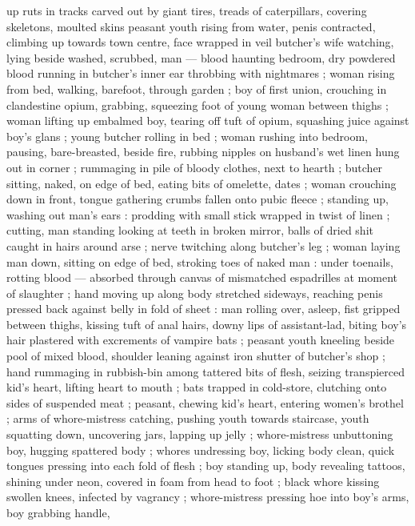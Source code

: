up ruts in tracks carved out by giant tires, treads of caterpillars, covering skeletons, moulted
skins {\semislash} peasant youth rising from water, penis contracted, climbing up towards town
centre, face wrapped in veil {\semislash} butcher's %
wife watching, lying beside washed, scrubbed, man --- blood haunting bedroom, dry powdered blood
running in butcher's inner ear throbbing with nightmares ; woman rising from bed, walking, barefoot,
through garden ; boy of first union, crouching in clandestine opium, grabbing, squeezing foot of
young woman between thighs ; woman lifting up embalmed boy, tearing off tuft of opium, squashing
juice against boy's glans ; young butcher rolling in bed ; woman rushing into bedroom, pausing,
bare-breasted, beside fire, rubbing nipples on husband's wet linen hung out in corner ; rummaging in
pile of bloody clothes, next to hearth ; butcher sitting, naked, on edge of bed, eating bits of
omelette, dates ; woman crouching down in front, tongue gathering crumbs fallen onto pubic fleece ;
standing up, washing out man's ears : prodding with small stick wrapped in twist of linen ; cutting,
man standing looking at teeth in broken mirror, balls of dried shit caught in hairs around arse ;
nerve twitching along butcher's leg ; woman laying man down, sitting on edge of bed, stroking toes
of naked man : under toenails, rotting blood --- absorbed through canvas of mismatched espadrilles
at moment of slaughter ; hand moving up along body stretched sideways, reaching penis pressed back
against belly in fold of sheet : man rolling over, asleep, fist gripped between thighs, kissing{\td}
tuft of anal hairs, downy lips of assistant-lad, biting boy's hair plastered with excrements of
vampire bats{\td} ; peasant youth kneeling beside pool of mixed blood, shoulder leaning against iron
shutter of butcher's shop ; hand rummaging in rubbish-bin among tattered bits of flesh, seizing
transpierced kid's heart, lifting heart to mouth ; bats trapped in cold-store, clutching onto sides
of suspended meat ; peasant, chewing kid's heart, entering women's brothel ; arms of whore-mistress
catching, pushing youth towards staircase, youth squatting down, uncovering jars, lapping up jelly ;
whore-mistress unbuttoning boy, hugging spattered body ; whores undressing boy, licking body clean,
quick tongues pressing into each fold of flesh ; boy standing up, body revealing tattoos, shining
under neon, covered in foam from head to foot ; black whore kissing swollen %
knees, infected by vagrancy ; whore-mistress pressing hoe into boy's arms, boy grabbing handle,
